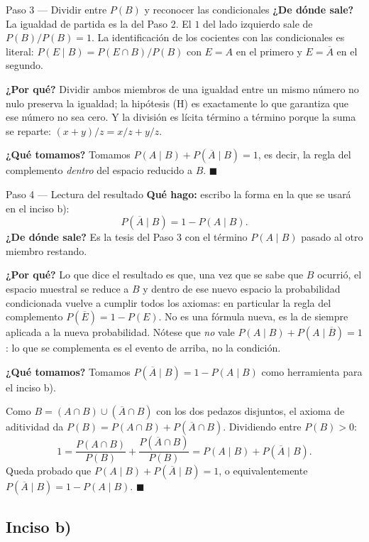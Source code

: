 \documentclass[11pt]{article}
\begin{document}
\begin{sol}
\begin{paso}{Paso 3 --- Dividir entre $P(B)$ y reconocer las condicionales}
\textbf{¿De dónde sale?} La igualdad de partida es la del Paso 2. El $1$ del lado izquierdo
sale de $P(B)/P(B)=1$. La identificación de los cocientes con las condicionales es literal:
$P(E\mid B)=P(E\cap B)/P(B)$ con $E=A$ en el primero y $E=\overline{A}$ en el segundo.

\textbf{¿Por qué?} Dividir ambos miembros de una igualdad entre un mismo número no nulo
preserva la igualdad; la hipótesis (H) es exactamente lo que garantiza que ese número no sea
cero. Y la división es lícita término a término porque la suma se reparte:
$(x+y)/z=x/z+y/z$.

\textbf{¿Qué tomamos?} Tomamos $P(A\mid B)+P(\overline{A}\mid B)=1$, es decir, la regla del
complemento \emph{dentro} del espacio reducido a $B$. $\blacksquare$
\end{paso}

\begin{paso}{Paso 4 --- Lectura del resultado}
\textbf{Qué hago:} escribo la forma en la que se usará en el inciso b):
\[
P(\overline{A}\mid B)=1-P(A\mid B).
\]
\textbf{¿De dónde sale?} Es la tesis del Paso 3 con el término $P(A\mid B)$ pasado al otro
miembro restando.

\textbf{¿Por qué?} Lo que dice el resultado es que, una vez que se sabe que $B$ ocurrió, el
espacio muestral se reduce a $B$ y dentro de ese nuevo espacio la probabilidad condicionada
vuelve a cumplir todos los axiomas: en particular la regla del complemento
$P(\overline{E})=1-P(E)$. No es una fórmula nueva, es la de siempre aplicada a la nueva
probabilidad. Nótese que \emph{no} vale $P(A\mid B)+P(A\mid\overline{B})=1$: lo que se
complementa es el evento de arriba, no la condición.

\textbf{¿Qué tomamos?} Tomamos $P(\overline{A}\mid B)=1-P(A\mid B)$ como herramienta para el
inciso b).
\end{paso}
\end{sol}

\begin{resp}
Como $B=(A\cap B)\cup(\overline{A}\cap B)$ con los dos pedazos disjuntos, el axioma de
aditividad da $P(B)=P(A\cap B)+P(\overline{A}\cap B)$. Dividiendo entre $P(B)>0$:
\[
1=\frac{P(A\cap B)}{P(B)}+\frac{P(\overline{A}\cap B)}{P(B)}=P(A\mid B)+P(\overline{A}\mid B).
\]
Queda probado que $P(A\mid B)+P(\overline{A}\mid B)=1$, o equivalentemente
$P(\overline{A}\mid B)=1-P(A\mid B)$. $\blacksquare$
\end{resp}

\subsection*{Inciso b)}
\end{document}
